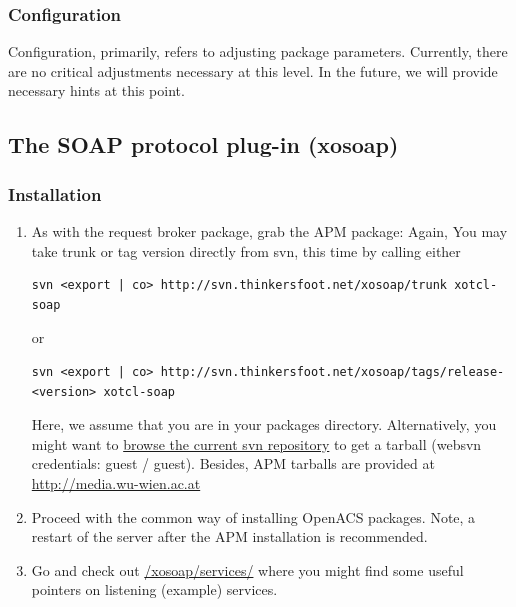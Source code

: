 	\subsubsection{Configuration}
	Configuration, primarily, refers to adjusting package parameters. Currently, there are no critical adjustments necessary at this level. In the future, we will provide necessary hints at this point.
	\subsection{The SOAP protocol plug-in (xosoap)}
	\subsubsection{Installation}
	\begin{enumerate}
	\item As with the request broker package, grab the APM package: Again, You may take trunk or tag version directly from svn, this time by calling either
	\begin{lstlisting}[breaklines=true,frame=single,basicstyle=
\footnotesize]
	svn <export | co> http://svn.thinkersfoot.net/xosoap/trunk xotcl-soap
	\end{lstlisting}
	or
	\begin{lstlisting}[breaklines=true,frame=single,basicstyle=
\footnotesize]
	svn <export | co> http://svn.thinkersfoot.net/xosoap/tags/release-<version> xotcl-soap
	\end{lstlisting}
	Here, we assume that you are in your packages directory. Alternatively, you might want to \href{http://stefan.thinkersfoot.net/websvn/listing.php?repname=xosoap&path=\%2F&sc=0}{browse the current svn repository} to get a tarball (websvn credentials: guest / guest). Besides, APM tarballs are provided at \href{http://media.wu-wien.ac.at/download/}{http://media.wu-wien.ac.at}
	\item Proceed with the common way of installing OpenACS packages. Note, a restart of the server after the APM installation is recommended.
	\item Go and check out  \href{/xosoap/services/}{/xosoap/services/} where you might find some useful pointers on listening (example) services. 
	\end{enumerate}

